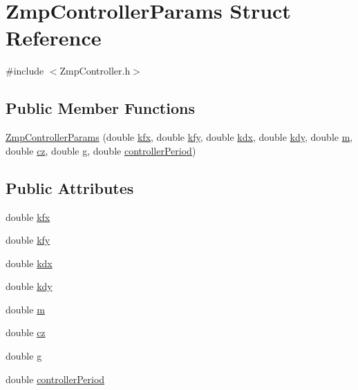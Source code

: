 \hypertarget{structZmpControllerParams}{\section{\-Zmp\-Controller\-Params \-Struct \-Reference}
\label{structZmpControllerParams}
}


{\ttfamily \#include $<$\-Zmp\-Controller.\-h$>$}

\subsection*{\-Public \-Member \-Functions}
\begin{DoxyCompactItemize}
\item 
\hyperlink{structZmpControllerParams_a4f31bfd3657a479f89fd9c8fb5c8cdf4}{\-Zmp\-Controller\-Params} (double \hyperlink{structZmpControllerParams_a92d3cbfd3c0c1f1df5115b97825889fb}{kfx}, double \hyperlink{structZmpControllerParams_ab90ab2a81a4a9060e5afe9ee8d144e6a}{kfy}, double \hyperlink{structZmpControllerParams_a423b5aa189459a96c2a271a656ccef48}{kdx}, double \hyperlink{structZmpControllerParams_ab27d119cdbcb1ce102e7bd0c95e8d78c}{kdy}, double \hyperlink{structZmpControllerParams_a09a7a86043a6b356478105f00ad84049}{m}, double \hyperlink{structZmpControllerParams_ad9ebbe3027001ce1600a8ac556061f7e}{cz}, double \hyperlink{structZmpControllerParams_a66ef6924d304ac0376ee64c2aa8234f9}{g}, double \hyperlink{structZmpControllerParams_a495732ae992cece73c131d04f9ab0cb2}{controller\-Period})
\end{DoxyCompactItemize}
\subsection*{\-Public \-Attributes}
\begin{DoxyCompactItemize}
\item 
double \hyperlink{structZmpControllerParams_a92d3cbfd3c0c1f1df5115b97825889fb}{kfx}
\item 
double \hyperlink{structZmpControllerParams_ab90ab2a81a4a9060e5afe9ee8d144e6a}{kfy}
\item 
double \hyperlink{structZmpControllerParams_a423b5aa189459a96c2a271a656ccef48}{kdx}
\item 
double \hyperlink{structZmpControllerParams_ab27d119cdbcb1ce102e7bd0c95e8d78c}{kdy}
\item 
double \hyperlink{structZmpControllerParams_a09a7a86043a6b356478105f00ad84049}{m}
\item 
double \hyperlink{structZmpControllerParams_ad9ebbe3027001ce1600a8ac556061f7e}{cz}
\item 
double \hyperlink{structZmpControllerParams_a66ef6924d304ac0376ee64c2aa8234f9}{g}
\item 
double \hyperlink{structZmpControllerParams_a495732ae992cece73c131d04f9ab0cb2}{controller\-Period}
\end{DoxyCompactItemize}


